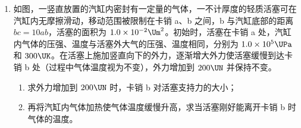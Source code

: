 \documentclass[\gkver]{gaokaozhenti}
\begin{document}
\begin{enumerate}
{C．c 中水的温度等于 d 中水的温度，则 c、d 中水的饱和气压相等，故 C 正确；

D．设大气压强为 $p_{0}$，试管内外水面的高度差为 $\Delta h$，则 a、b 中试管内气体的压强均为 $p = p_{0} + \rho_{\text{水}}g\Delta h$，故 D 正确；

E．d 中试管内气体的压强为 $p_{d} = p_{0} - \rho_{\text{水}}g\Delta h$，c 中试管内气体的压强为 $p_{c} = p_{0} + \rho_{\text{水}}g\Delta h$，可知 $p_{d} < p_{c}$，故 E 错误。

故选 ACD。
}

\item
如图，一竖直放置的汽缸内密封有一定量的气体，一不计厚度的轻质活塞可在汽缸内无摩擦滑动，移动范围被限制在卡销 a、b 之间，b 与汽缸底部的距离 $bc = 10ab$，活塞的面积为 $1.0\times10^{-2} \Um^{2}$。初始时，活塞在卡销 a 处，汽缸内气体的压强、温度与活塞外大气的压强、温度相同，分别为 $1.0\times10^{5} \UPa$ 和 $300 \UK$。在活塞上施加竖直向下的外力，逐渐增大外力使活塞缓慢到达卡销 b 处（过程中气体温度视为不变），外力增加到 $200 \UN$ 并保持不变。
\begin{enumerate}
	\item
	求外力增加到 $200 \UN$ 时，卡销 b 对活塞支持力的大小；
	\item
	再将汽缸内气体加热使气体温度缓慢升高，求当活塞刚好能离开卡销 b 时气体的温度。
\end{enumerate}


\jdanswer{
\begin{enumerate}
	\item
	$100 \UN$

	\item
	$327 \UK$

\end{enumerate}
}
\end{enumerate}
\end{document}
